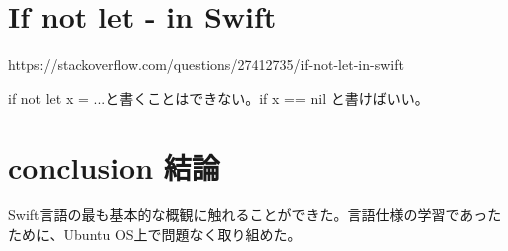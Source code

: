 \documentclass[uplatex,dvipdfmx]{jsarticle} \usepackage{amsmath,amssymb,bm}
\begin{document}
\section*{If not let - in Swift}
https://stackoverflow.com/questions/27412735/if-not-let-in-swift

if not let x = ...と書くことはできない。if x == nil と書けばいい。



\section*{conclusion 結論}
Swift言語の最も基本的な概観に触れることができた。言語仕様の学習であったために、Ubuntu OS上で問題なく取り組めた。


\vspace{\baselineskip}
\begin{paracol}{2}
\switchcolumn
\end{paracol}
\end{document}
